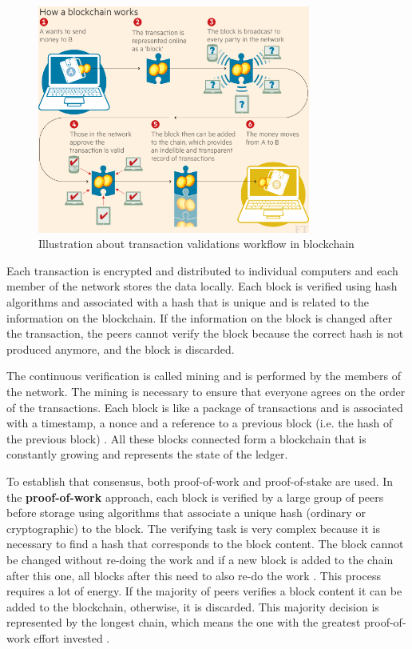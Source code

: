  \begin{figure}[h]
\centering
\includegraphics[width=0.8\textwidth]{./Images/ft}
\caption{Illustration about transaction validations workflow in blockchain}
\label{fig:bc}
\end{figure}


Each transaction is encrypted and distributed to individual computers and each member of the network stores the data locally. Each block is verified using hash algorithms and associated with a hash that is unique and is related to the information on the blockchain. If the information on the block is changed after the transaction, the peers cannot verify the block because the correct hash is not produced anymore, and the block is discarded.



The continuous verification is called mining and is performed by the members of the network. The mining is necessary to ensure that everyone agrees on the order of the transactions. Each block is like a package of transactions and is associated with a timestamp, a nonce and a reference to a previous block (i.e. the hash of the previous block) \cite{bitcoin}. All these blocks connected form a blockchain that is constantly growing and represents the state of the ledger.


To establish that consensus, both proof-of-work and proof-of-stake are used.
In the \textbf{proof-of-work} approach, each block is verified by a large group of peers before storage using algorithms that associate a unique hash (ordinary or cryptographic) to the block. The verifying task is very complex because it is necessary to find a hash that corresponds to the block content. The block cannot be changed without re-doing the work and if a new block is added to the chain after this one, all blocks after this need to also re-do the work \cite{bitcoin}. This process requires a lot of energy. If the majority of peers verifies a block content it can be added to the blockchain, otherwise, it is discarded. This majority decision is represented by the longest chain, which means the one with the greatest proof-of-work effort invested \cite{bitcoin}. 


